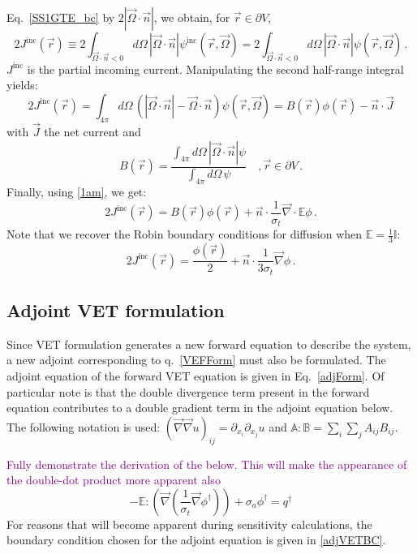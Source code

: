 \documentclass[12pt]{report}
\newcommand{\vr}{\vec{r}}
\newcommand{\vJ}{\vec{J}}
\newcommand{\vO}{\vec{\Omega}}
\renewcommand{\div}{\vec{\nabla} \cdot}
\newcommand{\grad}{\vec{\nabla}}
\newcommand{\bound}{\partial V}
\newcommand{\vn}{\vec{n}}
\newcommand{\Edd}{\mathbb{E}}
\newcommand{\BEdd}{B}
\newcommand{\sigt}{\sigma_t}
\newcommand{\siga}{\sigma_a}
\newcommand{\scalResp}{q^\dag}
\newcommand{\comment}[2]{\marginpar{\textcolor{#2}{$\star$}}\textcolor{#2}{#1}\newline}
\newcommand{\todo}[1]{\comment{#1}{purple}}
\newcommand{\todo}[1]{\phantom{a}}
\begin{document}
Eq.~\eqref{SS1GTE_bc} by $2 | \vO \cdot \vn |$, we obtain, for $\vr \in \bound$,
\begin{equation}
2 J^{\text{inc}}(\vr) \equiv  2 \int_{\vO \cdot \vn <0 }  d \Omega\, | \vO \cdot \vec{n} | \psi^{\text{inc}}(\vr,\vO) 
= 2\int_{\vO \cdot \vn <0 } d \Omega\,  | \vO \cdot \vn |  \psi(\vr,\vO) \,.
\end{equation}
$J^{\text{inc}}$ is the partial incoming current. 
Manipulating the second half-range integral yields:
\begin{equation}
2 J^{\text{inc}}(\vr) = \int_{4\pi} d \Omega\,  \left( | \vO \cdot \vn |- \vO\cdot\vn\right)  \psi(\vr,\vO) 
= \BEdd(\vr) \phi(\vr) - \vn \cdot \vJ 
\end{equation}
with $\vJ$ the net current and
\begin{equation}
\BEdd(\vr) = \frac{\int_{4 \pi} d\Omega \, | \vO \cdot \vn | \psi}{\int_{4\pi} d\Omega \, \psi} \quad , \vr \in \bound \,.
\end{equation}
Finally, using \eqref{1am}, we get:
\begin{equation}
2 J^{\text{inc}}(\vr) = \BEdd(\vr) \phi(\vr) + \vn \cdot \frac{1}{\sigt} \div \Edd \phi \,.
\end{equation}
Note that we recover the Robin boundary conditions for diffusion when $\Edd = \tfrac{1}{3} \mathbb{I}$:
\[
2 J^{\text{inc}}(\vr) = \frac{\phi(\vr)}{2} + \vn \cdot \frac{1}{3\sigt} \grad \phi \,.
\]


\subsection{Adjoint VET formulation}

Since VET formulation generates a new forward equation to describe the system, a new adjoint corresponding to q.~\eqref{VEFForm} must also be formulated. The adjoint equation of the forward VET equation is given in Eq.~\eqref{adjForm}. Of particular note is that the double divergence term present in the forward equation contributes to a double gradient term in the adjoint equation below. The following notation is used: $(\grad \grad u)_{ij} = \partial_{x_i} \partial_{x_j} u$
and $\mathbb{A} : \mathbb{B} = \sum_i \sum_j A_{ij}B_{ij}$. 

\todo{Fully demonstrate the derivation of the below. This will make the appearance of the double-dot product more apparent also}
\begin{equation}
\label{adjForm}
- \Edd : \left( \grad \left( \frac{1}{\sigt}\grad \phi^\dag \right) \right) + \siga \phi^\dag = \scalResp
\end{equation}
For reasons that will become apparent during sensitivity calculations, the boundary condition chosen for the adjoint equation is given in \eqref{adjVETBC}.
\end{document}
